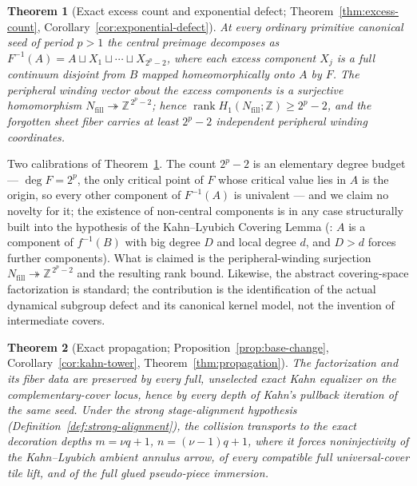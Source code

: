 \documentclass[11pt,reqno]{amsart}
\newtheorem{theorem}{Theorem}[section]
\theoremstyle{definition}
\theoremstyle{remark}
\begin{document}
\begin{theorem}[Exact excess count and exponential defect;
Theorem~\ref{thm:excess-count},
Corollary~\ref{cor:exponential-defect}]\label{thm:Cpp}
At every ordinary primitive canonical seed of period $p>1$ the central
preimage decomposes as
$F^{-1}(A)=A\sqcup X_{1}\sqcup\cdots\sqcup X_{2^{p}-2}$, where each
excess component $X_{j}$ is a full continuum disjoint from $B$ mapped
homeomorphically onto $A$ by $F$.  The peripheral winding vector about
the excess components is a surjective homomorphism
$N_{\mathrm{fill}}\twoheadrightarrow\mathbb Z^{\,2^{p}-2}$; hence
$\operatorname{rank}H_{1}(N_{\mathrm{fill}};\mathbb Z)\ge 2^{p}-2$,
and the forgotten sheet fiber carries at least $2^{p}-2$ independent
peripheral winding coordinates.
\end{theorem}

Two calibrations of Theorem~\ref{thm:Cpp}.  The count $2^{p}-2$ is an
elementary degree budget --- $\deg F=2^{p}$, the only critical point of
$F$ whose critical value lies in $A$ is the origin, so every other
component of $F^{-1}(A)$ is univalent --- and we claim no novelty for
it; the existence of non-central components is in any case structurally
built into the hypothesis of the Kahn--Lyubich Covering Lemma
(\cite[\S4]{KLDecorations08}: $A$ is a component of $f^{-1}(B)$ with
big degree $D$ and local degree $d$, and $D>d$ forces further
components).  What is claimed is the peripheral-winding surjection
$N_{\mathrm{fill}}\twoheadrightarrow\mathbb Z^{\,2^{p}-2}$ and the
resulting rank bound.  Likewise, the abstract covering-space
factorization is standard; the contribution is the identification of
the actual dynamical subgroup defect and its canonical kernel model,
not the invention of intermediate covers.

\begin{theorem}[Exact propagation; Proposition~\ref{prop:base-change},
Corollary~\ref{cor:kahn-tower}, Theorem~\ref{thm:propagation}]\label{thm:D}
The factorization and its fiber data are preserved by every full,
unselected exact Kahn equalizer on the complementary-cover locus, hence
by every depth of Kahn's pullback iteration of the same seed.  Under
the strong stage-alignment hypothesis
(Definition~\ref{def:strong-alignment}), the
collision transports to the exact decoration depths
$m=\nu q+1$, $n=(\nu-1)q+1$, where it forces noninjectivity of the
Kahn--Lyubich ambient annulus arrow, of every compatible full
universal-cover tile lift, and of the full glued pseudo-piece
immersion.
\end{theorem}
\end{document}
